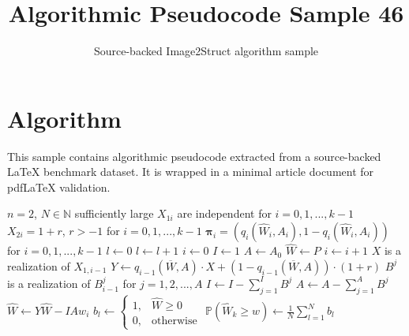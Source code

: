 \documentclass[11pt]{article}
\title{Algorithmic Pseudocode Sample 46}
\author{Source-backed Image2Struct algorithm sample}
\date{}
\begin{document}
\maketitle
\section{Algorithm}
This sample contains algorithmic pseudocode extracted from a source-backed LaTeX benchmark dataset. It is wrapped in a minimal article document for pdfLaTeX validation.

\begin{algorithm}[htbp]
\caption{Source-backed algorithmic procedure}
\begin{algorithm}
\caption{Compute $\mathbb{P}(\widehat{W}_k\geq w)$ given $\boldsymbol\pi_i$ for $i=0,1,...,k-1$}
\begin{algorithmic}
\Require $n=2$, $N\in\mathbb{N}$ sufficiently large
\Require $X_{1i}$ are independent for $i=0,1,...,k-1$
\Require $X_{2i}=1+r$, $r>-1$ for $i=0,1,...,k-1$
\Require $\boldsymbol\pi_{i}=(q_i(\widehat{W}_i,A_i),1-q_i(\widehat{W}_i,A_i))$ for $i=0,1,...,k-1$
\State $l\gets 0$
\State $l\gets l+1$
\State $i\gets 0$ 
\State $I\gets 1$ 
\State $A\gets A_0$ 
\State $\widehat{W}\gets P$ 
\State $i\gets i+1$
\State $X$ is a realization of $X_{1,i-1}$
\State $Y\gets q_{i-1}(\overline{W},A)\cdot X+(1-q_{i-1}(\overline{W},A))\cdot (1+r)$
\State $B^j$ is a realization of $B_{i-1}^j$ for $j=1,2,...,A$
\State $I\gets I-\sum_{j=1}^IB^j$
\State $A\gets A-\sum_{j=1}^AB^j$
\State $\widehat{W}\gets Y\widehat{W}-IAw_i$ 
\EndWhile
\State $b_l\gets\begin{cases}
1,&\widehat{W}\geq 0\\0,&\text{otherwise}\end{cases}
$
\EndWhile
\State $\mathbb{P}(\widehat{W}_k\geq w)\gets\frac{1}{N}\sum_{l=1}^Nb_l$\\
\end{algorithmic}
\end{algorithm}
\end{algorithm}
\end{document}
